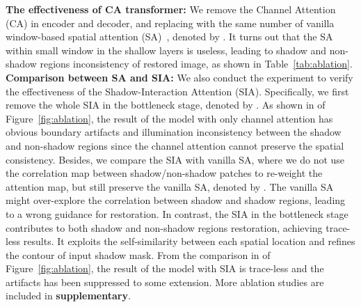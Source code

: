 \documentclass[letterpaper]{article} \usepackage{aaai23}  \usepackage{times}  \usepackage{helvet}  \usepackage{courier}  \usepackage[hyphens]{url}  \usepackage{graphicx} \urlstyle{rm} \def\UrlFont{\rm}  \usepackage{natbib}  \usepackage{caption} \frenchspacing  \setlength{\pdfpagewidth}{8.5in} \setlength{\pdfpageheight}{11in} \usepackage{algorithm}
\begin{document}
\noindent\textbf{The effectiveness of CA transformer:}
We remove the Channel Attention (CA) in encoder and decoder, and replacing with the same number of vanilla window-based spatial attention (SA)~\cite{wang2021uformer}, denoted by . 
It turns out that the SA within small window in the shallow layers is useless, leading to shadow and non-shadow regions inconsistency of restored image, as shown in Table~\ref{tab:ablation}.
\noindent\textbf{Comparison between SA and SIA:}
We also conduct the experiment to verify the effectiveness of the Shadow-Interaction Attention (SIA). Specifically, we first remove the whole SIA in the bottleneck stage, denoted by . 
As shown in  of Figure~\ref{fig:ablation}, the result of the model with only channel attention has obvious boundary artifacts and illumination inconsistency between the shadow and non-shadow regions since the channel attention cannot preserve the spatial consistency.
Besides, we compare the SIA with vanilla SA, where we do not use the correlation map between shadow/non-shadow patches to re-weight the attention map, but still preserve the vanilla SA, denoted by .
The vanilla SA might over-explore the correlation between shadow and shadow regions, leading to a wrong guidance for restoration.
In contrast, the SIA in the bottleneck stage contributes to both shadow and non-shadow regions restoration, achieving trace-less results. It exploits the self-similarity between each spatial location and refines the contour of input shadow mask.
From the comparison in  of Figure~\ref{fig:ablation}, the result of the model with SIA is trace-less and the artifacts has been suppressed to some extension. More ablation studies are included in \textbf{supplementary}. 
\end{document}
